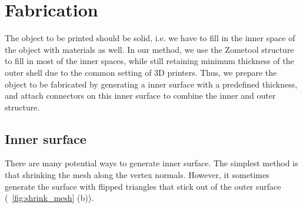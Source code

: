 \section{Fabrication}
\label{sec:fab}
The object to be printed should be solid, i.e. we have to fill in the inner space of the object with materials as well.
In our method, we use the Zometool structure to fill in most of the inner spaces, while still retaining minimum thickness of the outer shell due to the common setting of 3D printers.
Thus, we prepare the object to be fabricated by generating a inner surface with a predefined thickness, and attach connectors on this inner surface to combine the inner and outer structure.
    
\subsection{Inner surface}
There are many potential ways to generate inner surface. 
The simplest method is that shrinking the mesh along the vertex normals.
However, it sometimes generate the surface with flipped triangles that stick out of the outer surface (\figname~\ref{fig:shrink_mesh} (b)).

